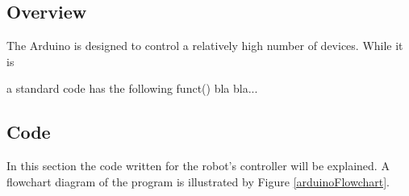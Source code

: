 \subsection{Overview}
The Arduino is designed to control a relatively high number of devices. While it is 


a standard code has the following funct() bla bla...

\newpage
\subsection{Code}

In this section the code written for the robot's controller will be explained. A flowchart diagram of the program is illustrated by Figure \ref{arduinoFlowchart}.\\

